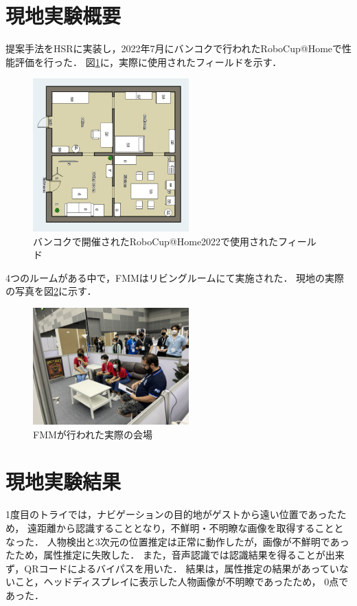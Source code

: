 \documentclass[a4j]{jarticle}
\begin{document}
\section{現地実験概要}
提案手法をHSRに実装し，2022年7月にバンコクで行われたRoboCup@Homeで性能評価を行った．
図\ref{robocup_field}に，実際に使用されたフィールドを示す．
\begin{figure}[ht]
  \centering
  \includegraphics[width=6cm]{images/robocup/arenaBangkok_rotate.png}
  \caption{バンコクで開催されたRoboCup@Home2022で使用されたフィールド}
  \label{robocup_field}
\end{figure}
4つのルームがある中で，FMMはリビングルームにて実施された．
現地の実際の写真を図\ref{onsite_overview_1}に示す．
\begin{figure}[ht]
  \centering
  \includegraphics[width=6cm]{images/robocup/FMM_onsite_overview_1.jpg}
  \caption{FMMが行われた実際の会場}
  \label{onsite_overview_1}
\end{figure}


\section{現地実験結果}
1度目のトライでは，ナビゲーションの目的地がゲストから遠い位置であったため，
遠距離から認識することとなり，不鮮明・不明瞭な画像を取得することとなった．
人物検出と3次元の位置推定は正常に動作したが，画像が不鮮明であったため，属性推定に失敗した．
また，音声認識では認識結果を得ることが出来ず，QRコードによるバイパスを用いた．
結果は，属性推定の結果があっていないこと，ヘッドディスプレイに表示した人物画像が不明瞭であったため，
0点であった．
\end{document}
